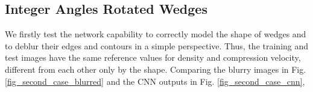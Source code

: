 \documentclass[conference]{IEEEtran}
\begin{document}
\subsection{Integer Angles Rotated Wedges} \label{IARW}
We firstly test the network capability to correctly model the shape of wedges
and to deblur their edges and contours in a simple perspective.
Thus, the training and test images have the same reference values for
density and compression velocity, different from each other only by the shape.
Comparing the blurry images in Fig. \ref{fig_second_case_blurred} and the CNN outputs in Fig. \ref{fig_second_case_cnn},
\begin{figure}[!t]
\centering
{}
\end{figure}
\end{document}
